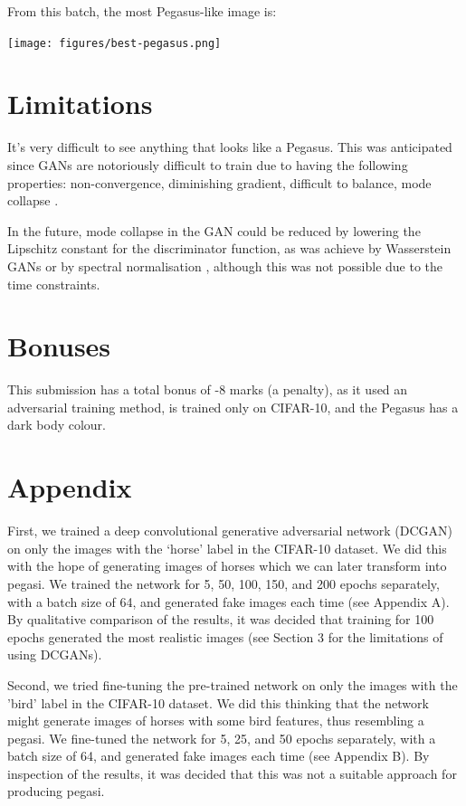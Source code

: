 \documentclass{article}
\begin{document}
From this batch, the most Pegasus-like image is:
\begin{center}
    \texttt{[image: figures/best-pegasus.png]}
\end{center}

\section{Limitations}
It's very difficult to see anything that looks like a Pegasus. This was anticipated since GANs are notoriously difficult to train due to having the following properties: non-convergence, diminishing gradient, difficult to balance, mode collapse \cite{}. 

In the future, mode collapse in the GAN could be reduced by lowering the Lipschitz constant for the discriminator function, as was achieve by Wasserstein GANs \cite{arjovsky2017wasserstein} or by spectral normalisation \cite{DBLP:journals/corr/abs-1802-05957}, although this was not possible due to the time constraints.

\section*{Bonuses}
This submission has a total bonus of -8 marks (a penalty), as it used an adversarial training method, is trained only on CIFAR-10, and the Pegasus has a dark body colour.

\section{Appendix}
First, we trained a deep convolutional generative adversarial network (DCGAN)~\cite{} on only the images with the `horse' label in the CIFAR-10 dataset. We did this with the hope of generating images of horses which we can later transform into pegasi. We trained the network for 5, 50, 100, 150, and 200 epochs separately, with a batch size of 64, and generated fake images each time (see Appendix A). By qualitative comparison of the results, it was decided that training for 100 epochs generated the most realistic images (see Section 3 for the limitations of using DCGANs).  

Second, we tried fine-tuning the pre-trained network on only the images with the 'bird' label in the CIFAR-10 dataset. We did this thinking that the network might generate images of horses with some bird features, thus resembling a pegasi. We fine-tuned the network for 5, 25, and 50 epochs separately, with a batch size of 64, and generated fake images each time (see Appendix B). By inspection of the results, it was decided that this was not a suitable approach for producing pegasi.  
\end{document}
